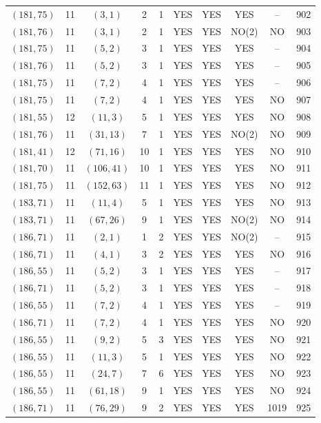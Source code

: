 \begin{longtable}{|c|c|c|c|c|c|c|c|c|c|}
$(181, 75)$ & 11 & $(3, 1)$ & 2 & 1 & YES & YES & YES & -- & 902\\
$(181, 76)$ & 11 & $(3, 1)$ & 2 & 1 & YES & YES & NO(2) & NO & 903\\
$(181, 75)$ & 11 & $(5, 2)$ & 3 & 1 & YES & YES & YES & -- & 904\\
$(181, 76)$ & 11 & $(5, 2)$ & 3 & 1 & YES & YES & YES & -- & 905\\
$(181, 75)$ & 11 & $(7, 2)$ & 4 & 1 & YES & YES & YES & -- & 906\\
$(181, 75)$ & 11 & $(7, 2)$ & 4 & 1 & YES & YES & YES & NO & 907\\
$(181, 55)$ & 12 & $(11, 3)$ & 5 & 1 & YES & YES & YES & NO & 908\\
$(181, 76)$ & 11 & $(31, 13)$ & 7 & 1 & YES & YES & NO(2) & NO & 909\\
$(181, 41)$ & 12 & $(71, 16)$ & 10 & 1 & YES & YES & YES & NO & 910\\
$(181, 70)$ & 11 & $(106, 41)$ & 10 & 1 & YES & YES & YES & NO & 911\\
$(181, 75)$ & 11 & $(152, 63)$ & 11 & 1 & YES & YES & YES & NO & 912\\
$(183, 71)$ & 11 & $(11, 4)$ & 5 & 1 & YES & YES & YES & NO & 913\\
$(183, 71)$ & 11 & $(67, 26)$ & 9 & 1 & YES & YES & NO(2) & NO & 914\\
$(186, 71)$ & 11 & $(2, 1)$ & 1 & 2 & YES & YES & NO(2) & -- & 915\\
$(186, 71)$ & 11 & $(4, 1)$ & 3 & 2 & YES & YES & YES & NO & 916\\
$(186, 55)$ & 11 & $(5, 2)$ & 3 & 1 & YES & YES & YES & -- & 917\\
$(186, 71)$ & 11 & $(5, 2)$ & 3 & 1 & YES & YES & YES & -- & 918\\
$(186, 55)$ & 11 & $(7, 2)$ & 4 & 1 & YES & YES & YES & -- & 919\\
$(186, 71)$ & 11 & $(7, 2)$ & 4 & 1 & YES & YES & YES & NO & 920\\
$(186, 55)$ & 11 & $(9, 2)$ & 5 & 3 & YES & YES & YES & NO & 921\\
$(186, 55)$ & 11 & $(11, 3)$ & 5 & 1 & YES & YES & YES & NO & 922\\
$(186, 55)$ & 11 & $(24, 7)$ & 7 & 6 & YES & YES & YES & NO & 923\\
$(186, 55)$ & 11 & $(61, 18)$ & 9 & 1 & YES & YES & YES & NO & 924\\
$(186, 71)$ & 11 & $(76, 29)$ & 9 & 2 & YES & YES & YES & 1019 & 925\\

\end{longtable}
